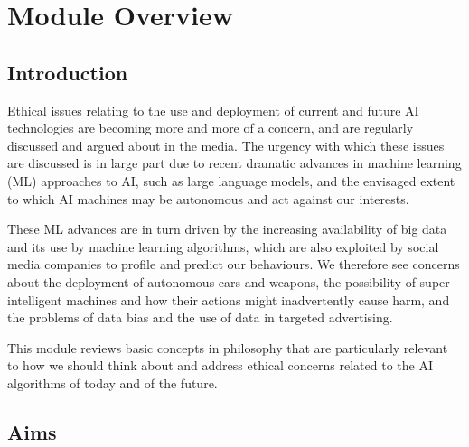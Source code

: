 \section*{Module Overview}

\subsection*{Introduction}

Ethical issues relating to the use and deployment of current and future AI technologies are becoming more and more of a concern, and are regularly discussed and argued about in the media. The urgency with which these issues are discussed is in large part due to recent dramatic advances in machine learning (ML) approaches to AI, such as large language models, and the envisaged extent to which AI machines may be autonomous and act against our interests.

These ML advances are in turn driven by the increasing availability of big data and its use by machine learning algorithms, which are also exploited by social media companies to profile and predict our behaviours. We therefore see concerns about the deployment of autonomous cars and weapons, the possibility of super-intelligent machines and how their actions might inadvertently cause harm, and the problems of data bias and the use of data in targeted advertising.

This module reviews basic concepts in philosophy that are particularly relevant to how we should think about and address ethical concerns related to the AI algorithms of today and of the future.

\separator

\subsection*{Aims}

